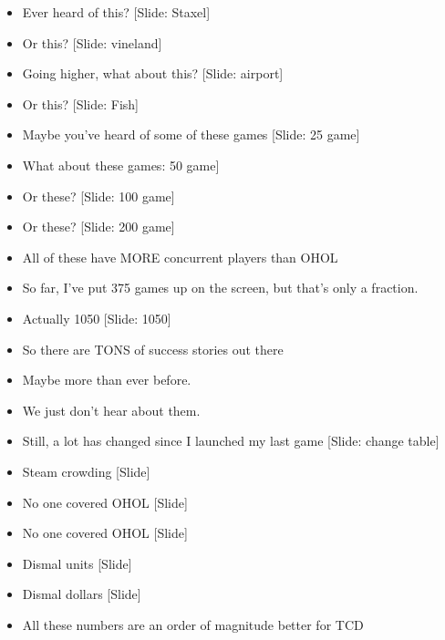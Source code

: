 \documentclass[12pt]{article}
\begin{document}
{\begin{itemize}
\item Ever heard of this?  [Slide:  Staxel]

\item Or this?  [Slide: vineland]

\item Going higher, what about this? [Slide: airport]

\item Or this? [Slide: Fish]

\item Maybe you've heard of some of these games [Slide: 25 game]

\item What about these games: 50 game]

\item Or these? [Slide: 100 game]

\item Or these? [Slide: 200 game]

\item All of these have MORE concurrent players than OHOL

\item So far, I've put 375 games up on the screen, but that's only a fraction.

\item Actually 1050 [Slide:  1050]

\item So there are TONS of success stories out there

\item Maybe more than ever before.

\item We just don't hear about them.

\item Still, a lot has changed since I launched my last game [Slide: change table]

\item Steam crowding [Slide]

\item No one covered OHOL [Slide]

\item No one covered OHOL [Slide]

\item Dismal units [Slide]

\item Dismal dollars [Slide]

\item All these numbers are an order of magnitude better for TCD


\end{itemize}}
\end{document}
